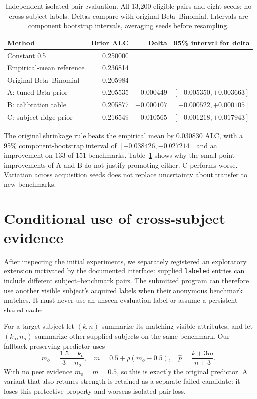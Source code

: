 \documentclass{article}
\begin{document}
\begin{table}[t]
\centering\small
\caption{Independent isolated-pair evaluation. All 13,200 eligible pairs and
eight seeds; no cross-subject labels. Deltas compare with original Beta--Binomial.
Intervals are component bootstrap intervals, averaging seeds before resampling.}
\label{tab:initial}
\begin{tabular}{lrrl}
\toprule
Method & Brier ALC & Delta & 95\% interval for delta\\
\midrule
Constant 0.5 & 0.250000 & & \\
Empirical-mean reference & 0.236814 & & \\
Original Beta--Binomial & 0.205984 & & \\
A: tuned Beta prior & 0.205535 & $-0.000449$ & $[-0.005350,+0.003663]$\\
B: calibration table & 0.205877 & $-0.000107$ & $[-0.000522,+0.000105]$\\
C: subject ridge prior & 0.216549 & $+0.010565$ & $[+0.001218,+0.017943]$\\
\bottomrule
\end{tabular}
\end{table}

The original shrinkage rule beats the empirical mean by 0.030830 ALC,
with a 95\% component-bootstrap interval of $[-0.038426,-0.027214]$ and an
improvement on 133 of 151 benchmarks. Table~\ref{tab:initial} shows why the
small point improvements of A and B do not justify promoting either. C
performs worse. Variation across acquisition seeds does not replace
uncertainty about transfer to new benchmarks.

\section{Conditional use of cross-subject evidence}
After inspecting the initial experiments, we separately registered an
exploratory extension motivated by the documented interface: supplied
\texttt{labeled} entries can include different subject--benchmark pairs.
The submitted program can therefore use another visible subject's acquired
labels when their anonymous benchmark matches. It must never use an unseen
evaluation label or assume a persistent shared cache.

For a target subject let $(k,n)$ summarize its matching visible attributes,
and let $(k_o,n_o)$ summarize other supplied subjects on the same benchmark.
Our fallback-preserving predictor uses
\begin{equation}
 m_o=\frac{1.5+k_o}{3+n_o},\quad
 m=0.5+\rho(m_o-0.5),\quad
 \widehat p=\frac{k+3m}{n+3}.
\end{equation}
With no peer evidence $m_o=m=0.5$, so this is exactly the original predictor.
A variant that also retunes strength is retained as a separate failed
candidate: it loses this protective property and worsens isolated-pair loss.
\end{document}
